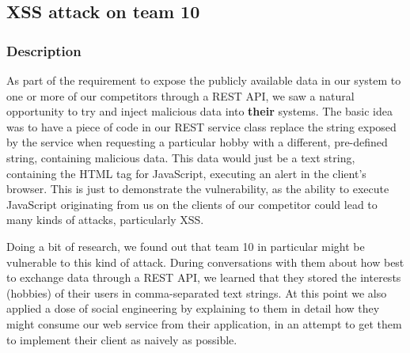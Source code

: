 \documentclass[a4paper]{article}
\begin{document}






\subsection{XSS attack on team 10}
\subsubsection{Description}
As part of the requirement to expose the publicly available data in our system to one or more of our competitors through a REST API, we saw a natural opportunity to try and inject malicious data into \textbf{their} systems. The basic idea was to have a piece of code in our REST service class replace the string exposed by the service when requesting a particular hobby with a different, pre-defined string, containing malicious data. This data would just be a text string, containing the HTML tag for JavaScript, executing an alert in the client's browser. This is just to demonstrate the vulnerability, as the ability to execute JavaScript originating from us on the clients of our competitor could lead to many kinds of attacks, particularly XSS.

Doing a bit of research, we found out that team 10 in particular might be vulnerable to this kind of attack. During conversations with them about how best to exchange data through a REST API, we learned that they stored the interests (hobbies) of their users in comma-separated text strings. At this point we also applied a dose of social engineering by explaining to them in detail how they might consume our web service from their application, in an attempt to get them to implement their client as naively as possible.
\end{document}
